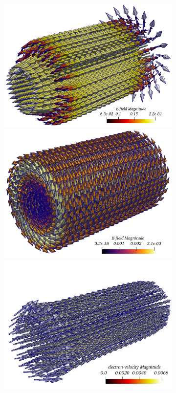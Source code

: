\documentclass{article}
\begin{document}
\begin{figure}
\begin{subfigure}[b]{\textwidth}
\begin{tikzpicture}
        \end{tikzpicture}
        \includegraphics[scale=0.2]{paper_version/figures/E-field_lambda-0.png}
        \hspace{0.3cm}
        \includegraphics[scale=0.2]{paper_version/figures/B-field_lambda-0.png}
        \includegraphics[scale=0.2]{paper_version/figures/electronVel_lambda-0.png}

\end{subfigure}
\end{figure}
\end{document}
